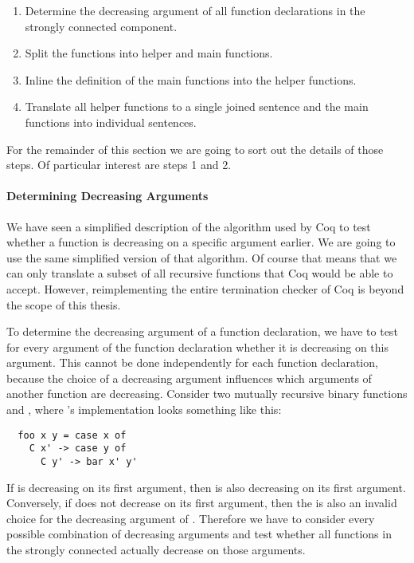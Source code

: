 \begin{enumerate}
  \item
  Determine the decreasing argument of all function declarations in the strongly connected component.
  \item
  Split the functions into helper and main functions.
  \item
  Inline the definition of the main functions into the helper functions.
  \item
  Translate all helper functions to a single joined  sentence and the main functions into individual  sentences.
\end{enumerate}

For the remainder of this section we are going to sort out the details of those steps.
Of particular interest are steps 1 and 2.

\paragraph{Determining Decreasing Arguments}
We have seen a simplified description of the algorithm used by Coq to test whether a function is decreasing on a specific argument earlier.
We are going to use the same simplified version of that algorithm.
Of course that means that we can only translate a subset of all recursive functions that Coq would be able to accept.
However, reimplementing the entire termination checker of Coq is beyond the scope of this thesis.

To determine the decreasing argument of a function declaration, we have to test for every argument of the function declaration whether it is decreasing on this argument.
This cannot be done independently for each function declaration, because the choice of a decreasing argument influences which arguments of another function are decreasing.
Consider two mutually recursive binary functions  and , where 's implementation looks something like this:
\begin{verbatim}
  foo x y = case x of
    C x' -> case y of
      C y' -> bar x' y'
\end{verbatim}
If  is decreasing on its first argument, then  is also decreasing on its first argument.
Conversely, if  does not decrease on its first argument, then the  is also an invalid choice for the decreasing argument of .
Therefore we have to consider every possible combination of decreasing arguments and test whether all functions in the strongly connected actually decrease on those arguments.

